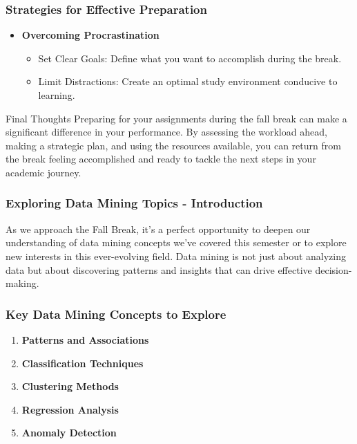 \documentclass[aspectratio=169]{beamer}
\begin{document}
\begin{frame}[fragile]
    \frametitle{Strategies for Effective Preparation}
    \begin{itemize}
        \item \textbf{Overcoming Procrastination}
        \begin{itemize}
            \item Set Clear Goals: Define what you want to accomplish during the break.
            \item Limit Distractions: Create an optimal study environment conducive to learning.
        \end{itemize}
    \end{itemize}
    
    \begin{block}{Final Thoughts}
        Preparing for your assignments during the fall break can make a significant difference in your performance. By assessing the workload ahead, making a strategic plan, and using the resources available, you can return from the break feeling accomplished and ready to tackle the next steps in your academic journey.
    \end{block}
\end{frame}

\begin{frame}[fragile]
    \frametitle{Exploring Data Mining Topics - Introduction}
    As we approach the Fall Break, it's a perfect opportunity to deepen our understanding of data mining concepts we've covered this semester or to explore new interests in this ever-evolving field. Data mining is not just about analyzing data but about discovering patterns and insights that can drive effective decision-making.
\end{frame}

\begin{frame}[fragile]
    \frametitle{Key Data Mining Concepts to Explore}
    \begin{enumerate}
        \item \textbf{Patterns and Associations}
        \item \textbf{Classification Techniques}
        \item \textbf{Clustering Methods}
        \item \textbf{Regression Analysis}
        \item \textbf{Anomaly Detection}
    \end{enumerate}
\end{frame}
\end{document}
